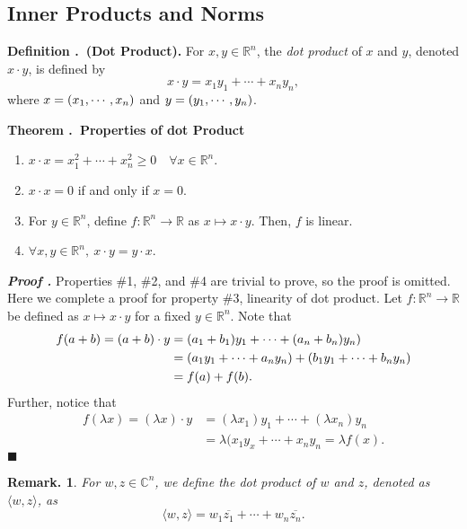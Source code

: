 \documentclass[11pt, letterpaper]{article}
\newcounter{index}[subsection]
\newenvironment*{df}[1]{\par\noindent\textbf{Definition \thesubsection.\stepcounter{index}\theindex\ (#1).}}{\par}
\newenvironment*{thm}[1]{\begin{tcolorbox}\par\noindent\textbf{Theorem \thesubsection.\stepcounter{index}\theindex\ #1} \par}{\par\end{tcolorbox}}
\newcounter{nprf}[subsection]
\newenvironment*{prf}{\par\indent\textbf{\textit{Proof \stepcounter{nprf}\thenprf.}}}{\hfill$\blacksquare$\par}
\newtheorem*{rmk}{Remark.}
\def\R{\mathbb{R}}
\def\C{\mathbb{C}}
\begin{document}
\subsection{Inner Products and Norms}
\begin{df}{Dot Product}
	For $x,y\in\R^n$, the \textit{dot product} of $x$ and $y$, denoted $x\cdot y$, is defined by \[x\cdot y=x_1y_1+\cdots+x_ny_n,\] where $x=\qty(x_1,\cdots,x_n)$ and $y=\qty(y_1,\cdots,y_n)$.	
\end{df}
\begin{thm}{Properties of dot Product}
	\begin{enumerate}
		\item $x\cdot x=x_1^2+\cdots+x_n^2\geq0\quad\forall x\in\R^n$.
		\item $x\cdot x=0$ if and only if $x=0$.
		\item For $y\in\R^n$, define $f:\R^n\to\R$ as $x\mapsto x\cdot y$. Then, $f$ is linear.
		\item $\forall x,y\in\R^n,\ x\cdot y=y\cdot x$.
	\end{enumerate}	
\end{thm}
\begin{prf}
	Properties \#1, \#2, and \#4 are trivial to prove, so the proof is omitted. Here we complete a proof for property \#3, linearity of dot product. Let $f:\R^n\to\R$ be defined as $x\mapsto x\cdot y$ for a fixed $y\in\R^n$. Note that \[\begin{aligned}f(a+b)=(a+b)\cdot y&=(a_1+b_1)y_1+\cdots+(a_n+b_n)y_n)\\&=\qty(a_1y_1+\cdots+a_ny_n)+\qty(b_1y_1+\cdots+b_ny_n)\\&=f(a)+f(b).\end{aligned}\] Further, notice that \[\begin{aligned}f(\lambda x)=(\lambda x)\cdot y&=(\lambda x_1)y_1+\cdots+(\lambda x_n)y_n\\&=\lambda (x_1y_x+\cdots+x_ny_n=\lambda f(x).\end{aligned}\]
\end{prf}
\begin{rmk}
	For $w,z\in\C^n$, we define the dot product of $w$ and $z$, denoted as $\langle w,z\rangle$, as \[\langle w,z\rangle=w_1\overline{z_1}+\cdots+w_n\overline{z_n}.\]
\end{rmk}
\end{document}
